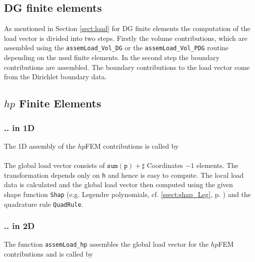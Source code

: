 \subsection{DG finite elements}

As mentioned in Section \ref{sect:load} for DG finite elements the computation of the load vector is divided into two steps. Firstly the volume contributions, which are assembled using the \texttt{assemLoad\_Vol\_DG} or the \texttt{assemLoad\_Vol\_PDG} routine depending on the used finite elements. In the second step the boundary contributions are assembled. The boundary contributions to the load vector come from the Dirichlet boundary data.


\subsection{$hp$ Finite Elements} 

\subsubsection{.. in 1D}

 The 1D assembly  of the $hp$FEM contributions is called by \\

 \\

 The global load vector consists of  $ \mathtt{sum(p)} + \sharp$ Coordinates $-1$ elements. The transformation depends only on {\tt h} and hence is easy to compute. The local load data is calculated and the global load vector then computed using the given shape function {\tt Shap} (e.g. Legendre polynomials, cf. \ref{ssect:shap_Leg}, p. \pageref{ssect:shap_Leg}) and the quadrature rule {\tt QuadRule}.


\subsubsection{.. in 2D}

 The function {\tt assemLoad\_hp} assembles the global load vector for the $hp$FEM contributions and is called by \\

